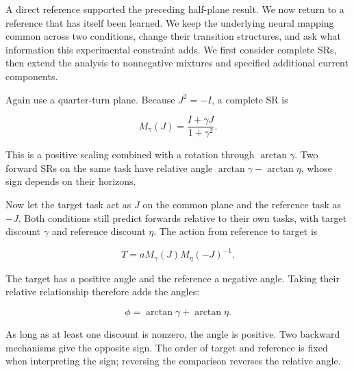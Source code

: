 \documentclass[11pt,a4paper]{article}
\begin{document}
A direct reference supported the preceding half-plane result. We now
return to a reference that has itself been learned. We keep the
underlying neural mapping common across two conditions, change their
transition structures, and ask what information this experimental
constraint adds. We first consider complete SRs, then extend the
analysis to nonnegative mixtures and specified additional current
components.

\par
\noindent\begin{minipage}{\linewidth}

Again use a quarter-turn plane. Because \(J^2=-I\), a complete SR is

\[
M_\gamma(J)=\frac{I+\gamma J}{1+\gamma^2}.
\]

\end{minipage}\par

This is a positive scaling combined with a rotation through
\(\arctan\gamma\). Two forward SRs on the same task have relative angle
\(\arctan\gamma-\arctan\eta\), whose sign depends on their horizons.

\par
\noindent\begin{minipage}{\linewidth}

Now let the target task act as \(J\) on the common plane and the
reference task as \(-J\). Both conditions still predict forwards
relative to their own tasks, with target discount \(\gamma\) and
reference discount \(\eta\). The action from reference to target is

\[
T=aM_\gamma(J)M_\eta(-J)^{-1}.
\]

\end{minipage}\par

\par
\noindent\begin{minipage}{\linewidth}

The target has a positive angle and the reference a negative angle.
Taking their relative relationship therefore adds the angles:

\[
\phi=\arctan\gamma+\arctan\eta.
\]

\end{minipage}\par

As long as at least one discount is nonzero, the angle is positive. Two
backward mechanisms give the opposite sign. The order of target and
reference is fixed when interpreting the sign; reversing the comparison
reverses the relative angle.
\end{document}
